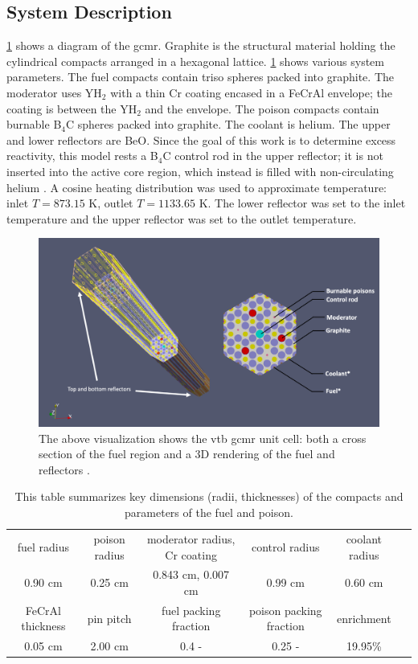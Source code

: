 \documentclass[letterpaper]{physor2024}
\begin{document}
\subsection{System Description}\label{sec:system}
\vspace*{-0.05cm}
 \cref{fig:vtb_gcmr} shows a diagram of the \gls{gcmr}. Graphite is the structural material holding the cylindrical compacts arranged in a hexagonal lattice. \cref{tab:dimensions} shows various system parameters. The fuel compacts contain \gls{triso} spheres packed into graphite. The moderator uses YH$_{2}$ with a thin Cr coating encased in a FeCrAl envelope; the coating is between the YH$_{2}$ and the envelope. The poison compacts contain burnable B$_{4}$C spheres packed into graphite. The coolant is helium. The upper and lower reflectors are BeO. Since the goal of this work is to determine excess reactivity, this model rests a B$_{4}$C control rod in the upper reflector; it is not inserted into the active core region, which instead is filled with non-circulating helium \cite{Abdelhameed-ANS-2022}. A cosine heating distribution was used to approximate temperature: inlet $T=873.15$ K, outlet $T=1133.65$ K. The lower reflector was set to the inlet temperature and the upper reflector was set to the outlet temperature.
\vspace*{-0.2cm}
 \begin{figure}[h]
    \centering
    \includegraphics[width=0.6\linewidth]{figures/vtb_gcmr_diagram.jpg}
    \caption{The above visualization shows the \gls{vtb} \gls{gcmr} unit cell: both a cross section of the fuel region and a 3D rendering of the fuel and reflectors \cite{Stauff-applications-2022}.}
    \label{fig:vtb_gcmr}
\end{figure}
\vspace*{-0.5cm}
\begin{table}[h]
    \centering
    \caption{This table summarizes key dimensions (radii, thicknesses) of the compacts and parameters of the fuel and poison.}
    \begin{tabular}{|c|c|c|c|c|c|}
    \hline
    fuel radius & poison radius & moderator radius, Cr coating & control radius & coolant radius \\
    0.90 cm & 0.25 cm   & 0.843 cm, 0.007 cm & 0.99 cm    & 0.60 cm  \\
    \hline
    FeCrAl thickness & pin pitch & fuel packing fraction & poison packing fraction & enrichment \\
    0.05 cm & 2.00 cm  & 0.4 -  & 0.25 - & 19.95\% \\
    \hline
    \end{tabular}
    \vspace{-0.5cm}
    \label{tab:dimensions}
\end{table}
\end{document}
